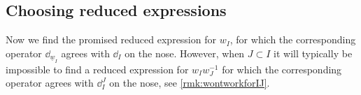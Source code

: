 




\subsection{Choosing reduced expressions} \label{subsec:stdrex}

Now we find the promised reduced expression for $w_I$, for which the corresponding operator $\dd_{\underline{w}_I}$ agrees with $\dd_I$ on the nose. However, when $J \subset I$ it will typically be impossible to find a reduced expression for $w_I w_J^{-1}$ for which the corresponding operator agrees with $\dd^J_I$ on the nose, see \cref{rmk:wontworkforIJ}.





